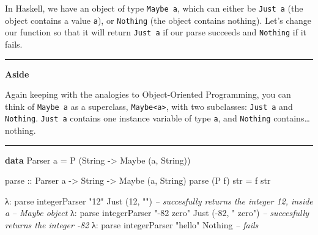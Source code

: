 \documentclass[]{article}
\newenvironment{Shaded}{}{}
\newcommand{\CommentTok}[1]{\textcolor[rgb]{0.38,0.63,0.69}{\textit{#1}}}
\newcommand{\DataTypeTok}[1]{\textcolor[rgb]{0.56,0.13,0.00}{#1}}
\newcommand{\DecValTok}[1]{\textcolor[rgb]{0.25,0.63,0.44}{#1}}
\newcommand{\FunctionTok}[1]{\textcolor[rgb]{0.02,0.16,0.49}{#1}}
\newcommand{\KeywordTok}[1]{\textcolor[rgb]{0.00,0.44,0.13}{\textbf{#1}}}
\newcommand{\NormalTok}[1]{#1}
\newcommand{\OtherTok}[1]{\textcolor[rgb]{0.00,0.44,0.13}{#1}}
\newcommand{\StringTok}[1]{\textcolor[rgb]{0.25,0.44,0.63}{#1}}
\begin{document}
In Haskell, we have an object of type \texttt{Maybe\ a}, which can either be
\texttt{Just\ a} (the object contains a value \texttt{a}), or \texttt{Nothing}
(the object contains nothing). Let's change our function so that it will return
\texttt{Just\ a} if our parse succeeds and \texttt{Nothing} if it fails.

\begin{center}\rule{0.5\linewidth}{\linethickness}\end{center}

\textbf{Aside}

Again keeping with the analogies to Object-Oriented Programming, you can think
of \texttt{Maybe\ a} as a superclass, \texttt{Maybe\textless{}a\textgreater{}},
with two subclasses: \texttt{Just\ a} and \texttt{Nothing}. \texttt{Just\ a}
contains one instance variable of type \texttt{a}, and \texttt{Nothing}
contains\ldots{}nothing.

\begin{center}\rule{0.5\linewidth}{\linethickness}\end{center}

\begin{Shaded}
\begin{Highlighting}[]
\KeywordTok{data} \DataTypeTok{Parser}\NormalTok{ a }\FunctionTok{=} \DataTypeTok{P}\NormalTok{ (}\DataTypeTok{String} \OtherTok{->} \DataTypeTok{Maybe}\NormalTok{ (a, }\DataTypeTok{String}\NormalTok{))}

\OtherTok{parse ::} \DataTypeTok{Parser}\NormalTok{ a }\OtherTok{->} \DataTypeTok{String} \OtherTok{->} \DataTypeTok{Maybe}\NormalTok{ (a, }\DataTypeTok{String}\NormalTok{)}
\NormalTok{parse (}\DataTypeTok{P}\NormalTok{ f) str }\FunctionTok{=}\NormalTok{ f str}
\end{Highlighting}
\end{Shaded}

\begin{Shaded}
\begin{Highlighting}[]
\NormalTok{λ}\FunctionTok{:}\NormalTok{ parse integerParser }\StringTok{"12"}
\DataTypeTok{Just}\NormalTok{ (}\DecValTok{12}\NormalTok{, }\StringTok{""}\NormalTok{)               }\CommentTok{-- succesfully returns the integer 12, inside a}
                            \CommentTok{-- Maybe object}
\NormalTok{λ}\FunctionTok{:}\NormalTok{ parse integerParser }\StringTok{"-82 zero"}
\DataTypeTok{Just}\NormalTok{ (}\FunctionTok{-}\DecValTok{82}\NormalTok{, }\StringTok{" zero"}\NormalTok{)         }\CommentTok{-- succesfully returns the integer -82}
\NormalTok{λ}\FunctionTok{:}\NormalTok{ parse integerParser }\StringTok{"hello"}
\DataTypeTok{Nothing}                     \CommentTok{-- fails}
\end{Highlighting}
\end{Shaded}
\end{document}
